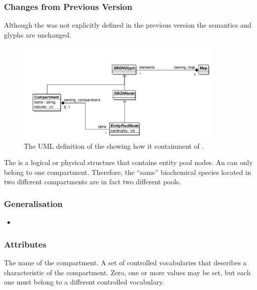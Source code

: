 \subsubsection{Changes from Previous Version}

Although the  was not explicitly defined in
the previous version the semantics and glyphs are unchanged.

\label{sec:techrefcompartment}
\label{defn:Compartment}

\begin{figure}[htb]
  \centering
  \includegraphics[width = 0.9\textwidth]{images/compartmentuml}
  \caption{The UML definition of the  showing
    how it containment of .}
  \label{fig:techref:compartmentuml}
\end{figure}

The  is a logical or physical structure that
contains entity pool nodes. An  can only
belong to one compartment. Therefore, the ``same'' biochemical species
located in two different compartments are in fact two different pools.


\subsubsection{Generalisation}

\begin{itemize}
\item {}
\end{itemize}

\subsubsection{Attributes}

\begin{attributes}
   The name of the compartment.
   A set of controlled vocabularies that describes
  a characteristic of the compartment. Zero, one or more values may be
  set, but each one must belong to a different controlled vocabulary.
\end{attributes}

